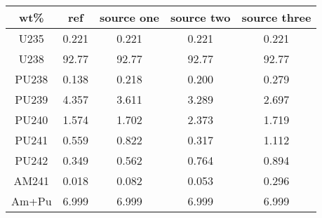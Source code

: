	\begin{tabular}{ccccc}
		\hline
		\textbf{wt\%} & \textbf{ref} & \textbf{source one} & \textbf{source two} & \textbf{source three} \\ 
		\hline
		U235 & 0.221 & 0.221 & 0.221 & 0.221 \\ 
		U238 & 92.77 & 92.77 & 92.77 & 92.77 \\ 
		PU238 & 0.138 & 0.218 & 0.200 & 0.279 \\ 
		PU239 & 4.357 & 3.611 & 3.289 & 2.697 \\ 
		PU240 & 1.574 & 1.702 & 2.373 & 1.719 \\ 
		PU241 & 0.559 & 0.822 & 0.317 & 1.112 \\ 
		PU242 & 0.349 & 0.562 & 0.764 & 0.894 \\ 
		AM241 & 0.018 & 0.082 & 0.053 & 0.296 \\ 
		Am+Pu & 6.999 & 6.999 & 6.999 & 6.999 \\ 
		\hline 
	\end{tabular} 
